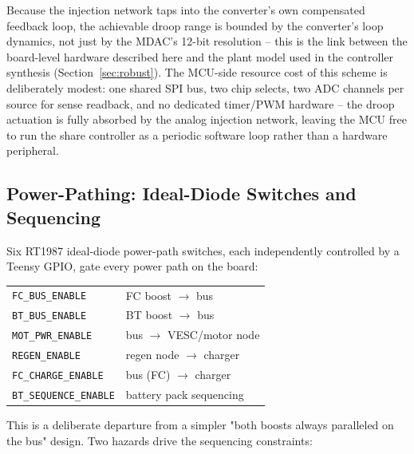 Because the injection network taps into the converter's own compensated
feedback loop, the achievable droop range is bounded by the converter's
loop dynamics, not just by the MDAC's 12-bit resolution -- this is the
link between the board-level hardware described here and the plant model
used in the controller synthesis (Section~\ref{sec:robust}). The MCU-side
resource cost of this scheme is deliberately modest: one shared SPI bus,
two chip selects, two ADC channels per source for sense readback, and no
dedicated timer/PWM hardware -- the droop actuation is fully absorbed by
the analog injection network, leaving the MCU free to run the share
controller as a periodic software loop rather than a hardware peripheral.

\subsection{Power-Pathing: Ideal-Diode Switches and Sequencing}
\label{sec:power-pathing}


Six RT1987 ideal-diode power-path switches, each independently controlled
by a Teensy GPIO, gate every power path on the board:

\begin{center}
\begin{tabular}{ll}
\texttt{FC\_BUS\_ENABLE} & FC boost $\rightarrow$ bus \\
\texttt{BT\_BUS\_ENABLE} & BT boost $\rightarrow$ bus \\
\texttt{MOT\_PWR\_ENABLE} & bus $\rightarrow$ VESC/motor node \\
\texttt{REGEN\_ENABLE} & regen node $\rightarrow$ charger \\
\texttt{FC\_CHARGE\_ENABLE} & bus (FC) $\rightarrow$ charger \\
\texttt{BT\_SEQUENCE\_ENABLE} & battery pack sequencing \\
\end{tabular}
\end{center}

This is a deliberate departure from a simpler "both boosts always
paralleled on the bus" design. Two hazards drive the sequencing
constraints:

